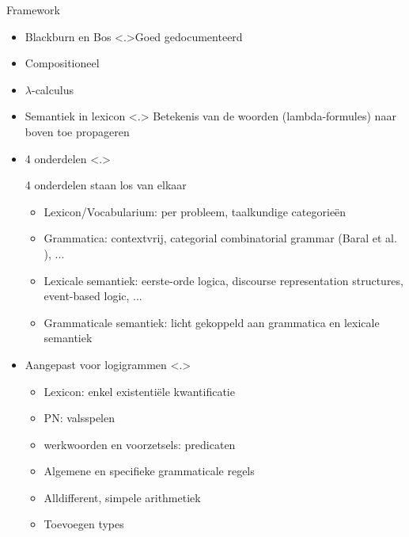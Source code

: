\documentclass[notes, dvipsnames]{beamer}
\newcommand{\seperation}{
	\vspace{1em}
	\ppause
}
\newcommand{\hitem}{
	\ppause
	\item
}
\newcommand{\ppause}{\onslide<+>}
\newcommand{\nnote}[1]{\note<.>{#1}}
\begin{document}
	\begin{frame}{Framework}
		\begin{itemize}
      \hitem Blackburn en Bos \cite{Blackburn2005, Blackburn2006}
      \nnote{Goed gedocumenteerd}

      \seperation
      \item Compositioneel
      \item $\lambda$-calculus
      \item Semantiek in lexicon
      \nnote{
        Betekenis van de woorden (lambda-formules) naar boven toe propageren
      }
      \hitem 4 onderdelen
      \nnote{
        4 onderdelen staan los van elkaar
        \begin{itemize}
          \item Lexicon/Vocabularium: per probleem, taalkundige categorieën
          \item Grammatica: contextvrij, categorial combinatorial grammar (Baral et al. \cite{Baral2008}), ...
          \item Lexicale semantiek: eerste-orde logica, discourse representation structures, event-based logic, ...
          \item Grammaticale semantiek: licht gekoppeld aan grammatica en lexicale semantiek
        \end{itemize}
      }

      \seperation
      \item Aangepast voor logigrammen
      \nnote{
        \begin{itemize}
          \item Lexicon: enkel existentiële kwantificatie
          \item PN: valsspelen
          \item werkwoorden en voorzetsels: predicaten
          \item Algemene en specifieke grammaticale regels
          \item Alldifferent, simpele arithmetiek
          \item Toevoegen types
        \end{itemize}
      }
		\end{itemize}
	\end{frame}
\end{document}
